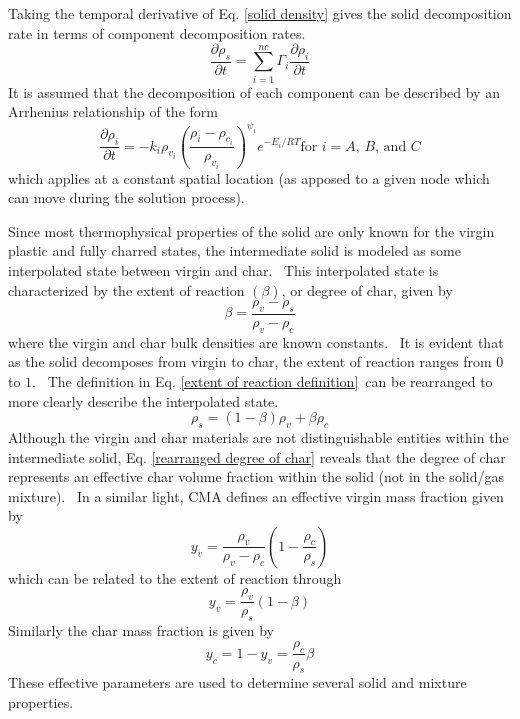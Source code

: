 Taking the temporal derivative of Eq. \ref{solid density} gives the solid
decomposition rate in terms of component decomposition rates.%
\begin{equation}
\frac{\partial \rho _{s}}{\partial t}= \sum_{i=1}^{nc} \Gamma_i \frac{\partial \rho _{i}}{\partial t}
\label{kinetic relationship sum}
\end{equation}%
It is assumed that the decomposition of each component can be described by
an Arrhenius relationship of the form%
\begin{equation}
\frac{\partial \rho _{i}}{\partial t}=-k_{i}\rho _{v_{i}}\left( \frac{\rho
_{i}-\rho _{c_{i}}}{\rho _{v_{i}}}\right) ^{\psi _{i}}e^{-E_{i}/RT}\text{
for }i=A\text{, }B\text{, and }C  \label{kinetic relationship}
\end{equation}%
which applies at a constant spatial location (as apposed to a given node which can move during the solution process).

Since most thermophysical properties of the solid are only known for the
virgin plastic and fully charred states, the intermediate solid is modeled
as some interpolated state between virgin and char. \ This interpolated
state is characterized by the extent of reaction $\left( \beta \right) $, or
degree of char, given by%
\begin{equation}
\beta =\frac{\rho _{v}-\rho _{s}}{\rho _{v}-\rho _{c}}
\label{extent of reaction definition}
\end{equation}%
where the virgin and char bulk densities are known constants. \ It is
evident that as the solid decomposes from virgin to char, the extent of
reaction ranges from $0$ to $1$. \ The definition in Eq. \ref{extent of
reaction definition}\ can be rearranged to more clearly describe the
interpolated state.%
\begin{equation}
\rho _{s}=\left( 1-\beta \right) \rho _{v}+\beta \rho _{c}
\label{rearranged degree of char}
\end{equation}%
Although the virgin and char materials are not distinguishable entities
within the intermediate solid, Eq. \ref{rearranged degree of char} reveals
that the degree of char represents an effective char volume fraction
within the solid (not in the solid/gas mixture). \ In a similar light, CMA
defines an effective virgin mass fraction given by%
\begin{equation}
y_{v}=\frac{\rho _{v}}{\rho _{v}-\rho _{c}}\left( 1-\frac{\rho _{c}}{\rho
_{s}}\right)
\end{equation}%
which can be related to the extent of reaction through%
\begin{equation}
y_{v}=\frac{\rho _{v}}{\rho _{s}}\left( 1-\beta \right)
\end{equation}%
Similarly the char mass fraction is given by%
\begin{equation}
y_{c}=1-y_{v}=\frac{\rho _{c}}{\rho _{s}}\beta
\end{equation}%
These effective parameters are used to determine several solid and mixture
properties.


